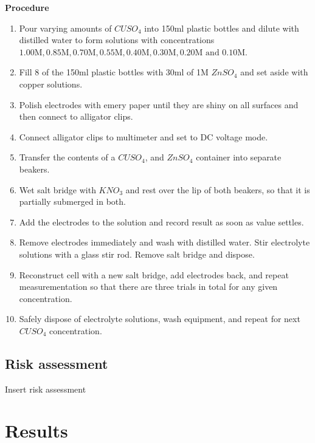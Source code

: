 \documentclass[11pt,a4paper]{article}
\begin{document}
\textbf{Procedure}
\begin{enumerate}
	\item Pour varying amounts of $CUSO_4$ into 150ml plastic bottles and dilute with distilled water to form solutions with concentrations $1.00\textrm{M}, 0.85\textrm{M}, 0.70\textrm{M}, 0.55\textrm{M}, 0.40\textrm{M}, 0.30\textrm{M}, 0.20\textrm{M and } 0.10\textrm{M}$.
	
	\item Fill 8 of the 150ml plastic bottles with 30ml of 1M $ZnSO_4$ and set aside with copper solutions. 

	
	\item Polish electrodes with emery paper until they are shiny on all surfaces and then connect to alligator clips.
	
	\item Connect alligator clips to multimeter and set to DC voltage mode.
	
	\item Transfer the contents of a $CUSO_4$, and $ZnSO_4$ container into separate beakers.
	
	\item Wet salt bridge with $KNO_3$ and rest over the lip of both beakers, so that it is partially submerged in both. 
	
	\item Add the electrodes to the solution and record result as soon as value settles.
	
	\item Remove electrodes immediately and wash with distilled water. Stir electrolyte solutions with a glass stir rod. Remove salt bridge and dispose.
	
	\item Reconstruct cell with a new salt bridge, add electrodes back, and repeat measurementation so that there are three trials in total for any given concentration.
	
	\item Safely dispose of electrolyte solutions, wash equipment, and repeat for next $CUSO_4$ concentration.
\end{enumerate}

\subsection{Risk assessment}
Insert risk assessment

\section{Results}
\end{document}
